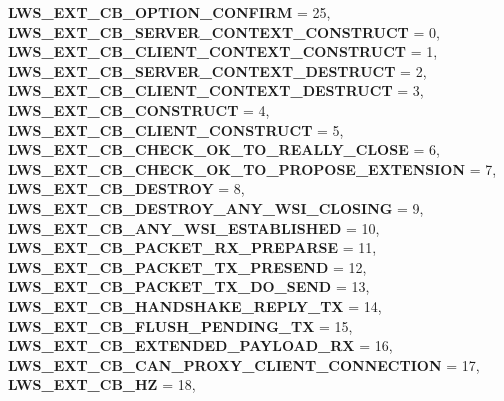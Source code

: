 \begin{DoxyCompactItemize}
{\bfseries L\+W\+S\+\_\+\+E\+X\+T\+\_\+\+C\+B\+\_\+\+O\+P\+T\+I\+O\+N\+\_\+\+C\+O\+N\+F\+I\+RM} = 25, 
{\bfseries L\+W\+S\+\_\+\+E\+X\+T\+\_\+\+C\+B\+\_\+\+S\+E\+R\+V\+E\+R\+\_\+\+C\+O\+N\+T\+E\+X\+T\+\_\+\+C\+O\+N\+S\+T\+R\+U\+CT} = 0, 
{\bfseries L\+W\+S\+\_\+\+E\+X\+T\+\_\+\+C\+B\+\_\+\+C\+L\+I\+E\+N\+T\+\_\+\+C\+O\+N\+T\+E\+X\+T\+\_\+\+C\+O\+N\+S\+T\+R\+U\+CT} = 1, 
\newline
{\bfseries L\+W\+S\+\_\+\+E\+X\+T\+\_\+\+C\+B\+\_\+\+S\+E\+R\+V\+E\+R\+\_\+\+C\+O\+N\+T\+E\+X\+T\+\_\+\+D\+E\+S\+T\+R\+U\+CT} = 2, 
{\bfseries L\+W\+S\+\_\+\+E\+X\+T\+\_\+\+C\+B\+\_\+\+C\+L\+I\+E\+N\+T\+\_\+\+C\+O\+N\+T\+E\+X\+T\+\_\+\+D\+E\+S\+T\+R\+U\+CT} = 3, 
{\bfseries L\+W\+S\+\_\+\+E\+X\+T\+\_\+\+C\+B\+\_\+\+C\+O\+N\+S\+T\+R\+U\+CT} = 4, 
{\bfseries L\+W\+S\+\_\+\+E\+X\+T\+\_\+\+C\+B\+\_\+\+C\+L\+I\+E\+N\+T\+\_\+\+C\+O\+N\+S\+T\+R\+U\+CT} = 5, 
\newline
{\bfseries L\+W\+S\+\_\+\+E\+X\+T\+\_\+\+C\+B\+\_\+\+C\+H\+E\+C\+K\+\_\+\+O\+K\+\_\+\+T\+O\+\_\+\+R\+E\+A\+L\+L\+Y\+\_\+\+C\+L\+O\+SE} = 6, 
{\bfseries L\+W\+S\+\_\+\+E\+X\+T\+\_\+\+C\+B\+\_\+\+C\+H\+E\+C\+K\+\_\+\+O\+K\+\_\+\+T\+O\+\_\+\+P\+R\+O\+P\+O\+S\+E\+\_\+\+E\+X\+T\+E\+N\+S\+I\+ON} = 7, 
{\bfseries L\+W\+S\+\_\+\+E\+X\+T\+\_\+\+C\+B\+\_\+\+D\+E\+S\+T\+R\+OY} = 8, 
{\bfseries L\+W\+S\+\_\+\+E\+X\+T\+\_\+\+C\+B\+\_\+\+D\+E\+S\+T\+R\+O\+Y\+\_\+\+A\+N\+Y\+\_\+\+W\+S\+I\+\_\+\+C\+L\+O\+S\+I\+NG} = 9, 
\newline
{\bfseries L\+W\+S\+\_\+\+E\+X\+T\+\_\+\+C\+B\+\_\+\+A\+N\+Y\+\_\+\+W\+S\+I\+\_\+\+E\+S\+T\+A\+B\+L\+I\+S\+H\+ED} = 10, 
{\bfseries L\+W\+S\+\_\+\+E\+X\+T\+\_\+\+C\+B\+\_\+\+P\+A\+C\+K\+E\+T\+\_\+\+R\+X\+\_\+\+P\+R\+E\+P\+A\+R\+SE} = 11, 
{\bfseries L\+W\+S\+\_\+\+E\+X\+T\+\_\+\+C\+B\+\_\+\+P\+A\+C\+K\+E\+T\+\_\+\+T\+X\+\_\+\+P\+R\+E\+S\+E\+ND} = 12, 
{\bfseries L\+W\+S\+\_\+\+E\+X\+T\+\_\+\+C\+B\+\_\+\+P\+A\+C\+K\+E\+T\+\_\+\+T\+X\+\_\+\+D\+O\+\_\+\+S\+E\+ND} = 13, 
\newline
{\bfseries L\+W\+S\+\_\+\+E\+X\+T\+\_\+\+C\+B\+\_\+\+H\+A\+N\+D\+S\+H\+A\+K\+E\+\_\+\+R\+E\+P\+L\+Y\+\_\+\+TX} = 14, 
{\bfseries L\+W\+S\+\_\+\+E\+X\+T\+\_\+\+C\+B\+\_\+\+F\+L\+U\+S\+H\+\_\+\+P\+E\+N\+D\+I\+N\+G\+\_\+\+TX} = 15, 
{\bfseries L\+W\+S\+\_\+\+E\+X\+T\+\_\+\+C\+B\+\_\+\+E\+X\+T\+E\+N\+D\+E\+D\+\_\+\+P\+A\+Y\+L\+O\+A\+D\+\_\+\+RX} = 16, 
{\bfseries L\+W\+S\+\_\+\+E\+X\+T\+\_\+\+C\+B\+\_\+\+C\+A\+N\+\_\+\+P\+R\+O\+X\+Y\+\_\+\+C\+L\+I\+E\+N\+T\+\_\+\+C\+O\+N\+N\+E\+C\+T\+I\+ON} = 17, 
\newline
{\bfseries L\+W\+S\+\_\+\+E\+X\+T\+\_\+\+C\+B\+\_\+HZ} = 18, 

\end{DoxyCompactItemize}
